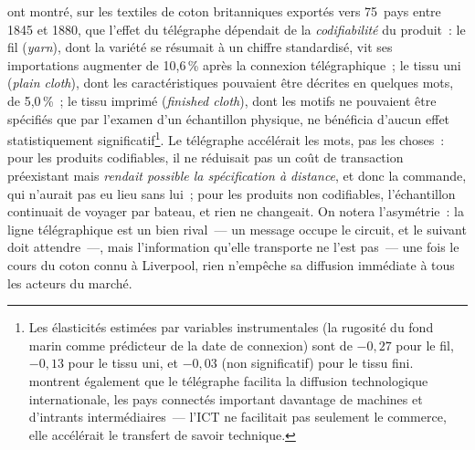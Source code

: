 \textcite{juhasz_spinning_2018} ont montré, sur les textiles de coton britanniques exportés vers 75~pays entre 1845 et 1880, que l'effet du télégraphe dépendait de la \emph{codifiabilité} du produit~: le fil (\emph{yarn}), dont la variété se résumait à un chiffre standardisé, vit ses importations augmenter de 10,6\,\% après la connexion télégraphique~; le tissu uni (\emph{plain cloth}), dont les caractéristiques pouvaient être décrites en quelques mots, de 5,0\,\%~; le tissu imprimé (\emph{finished cloth}), dont les motifs ne pouvaient être spécifiés que par l'examen d'un échantillon physique, ne bénéficia d'aucun effet statistiquement significatif\footnote{Les élasticités estimées par variables instrumentales (la rugosité du fond marin comme prédicteur de la date de connexion) sont de $-0{,}27$ pour le fil, $-0{,}13$ pour le tissu uni, et $-0{,}03$ (non significatif) pour le tissu fini. \textcite{juhasz_spinning_2018} montrent également que le télégraphe facilita la diffusion technologique internationale, les pays connectés important davantage de machines et d'intrants intermédiaires~--- l'ICT ne facilitait pas seulement le commerce, elle accélérait le transfert de savoir technique.}. %
Le télégraphe accélérait les mots, pas les choses~: pour les produits codifiables, il ne réduisait pas un coût de transaction préexistant mais \emph{rendait possible la spécification à distance}, et donc la commande, qui n'aurait pas eu lieu sans lui~; pour les produits non codifiables, l'échantillon continuait de voyager par bateau, et rien ne changeait. On notera l'asymétrie~: la ligne télégraphique est un bien rival~--- un message occupe le circuit, et le suivant doit attendre~---, mais l'information qu'elle transporte ne l'est pas~--- une fois le cours du coton connu à Liverpool, rien n'empêche sa diffusion immédiate à tous les acteurs du marché.

